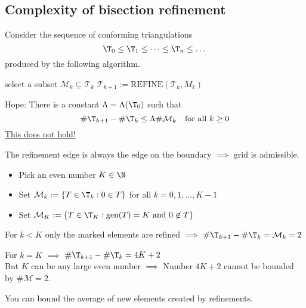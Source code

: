 \begin{enumerate}[label = \alph*)]
		\subsection{Complexity of bisection refinement}
		Consider the sequence of conforming triangulations 
		\begin{equation*}
			\T_{0} \leq \T_{1} \leq \dots \leq \T_{n} \leq \dots 
		\end{equation*}
		produced by the following algorithm.
    \begin{algorithmic}
    \State select a subset $\mathcal{M}_k \subseteq \mathcal{T}_k$
        \State $\mathcal{T}_{k + 1} := \text{REFINE}(\mathcal{T}_k, M_k)$
      \EndFor
    \end{algorithmic}
		Hope: There is a constant $\Lambda = \Lambda(\T_{0})$ such that 
		\begin{equation*}
      \#\T_{k+1} - \#\T_{k} \leq \Lambda \# \mathcal{M}_{k} \quad \text{for all } k \geq 0
		\end{equation*}
		\underline{This does not hold!}\\
    \begin{example}[Counterexample] \label{ex:counterexampleRefinementBoundary}
      The refinement edge is always the edge on the boundary $\implies$ grid is admissible.
      
      \begin{itemize}
        \item Pick an even number $K \in \N$ 
        \item Set $\mathcal{M}_{k} := \left\{ T \in \T_{k}: 0 \in T \right\} $ for all $k=0,1,\dots ,K-1$ 
          
        \item Set $\mathcal{M}_{K} := \left\{ T \in \T_{K}: \text{gen}(T)=K \text{ and } 0 \not\in T \right\}$ 
          
      \end{itemize}
      For $k < K$ only the marked elements are refined $\implies$ $\#\T_{k+1} - \#\T_{k} = \mathcal{M}_{k} = 2$	
      
      
      For $k=K$ $\implies$ $\#\T_{k+1} - \#\T_{k} = 4K +2$\\
      But $K$ can be any large even number $\implies$ Number $4K +2$ cannot be bounded by $\#\mathcal{M}=2$.
    \end{example} %
		You can bound the average of new elements created by refinements.

\end{enumerate}
